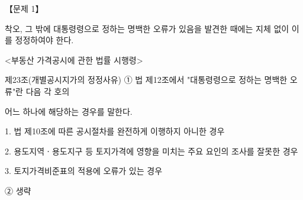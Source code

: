 \begin{longquestion}{【문제 1】}
\begin{framedtext}
착오, 그 밖에 대통령령으로 정하는 명백한 오류가 있음을 발견한 때에는 지체 없이 이를 정정하여야 한다. \par
<부동산 가격공시에 관한 법률 시행령> \par
제23조(개별공시지가의 정정사유) ① 법 제12조에서 "대통령령으로 정하는 명백한 오류"란 다음 각 호의 \par
어느 하나에 해당하는 경우를 말한다. \par
1. 법 제10조에 따른 공시절차를 완전하게 이행하지 아니한 경우 \par
2. 용도지역ㆍ용도지구 등 토지가격에 영향을 미치는 주요 요인의 조사를 잘못한 경우 \par
3. 토지가격비준표의 적용에 오류가 있는 경우 \par
② 생략 \par
\end{framedtext}
\end{longquestion}
